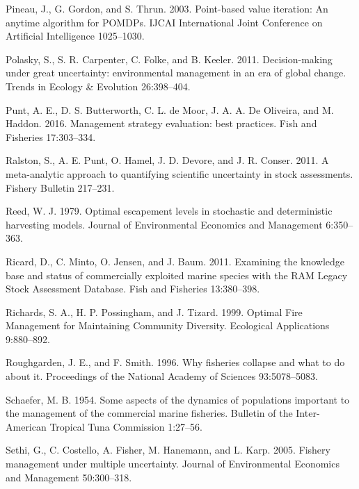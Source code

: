 \documentclass[3p]{elsarticle} %
\begin{document}
\leavevmode\hypertarget{ref-Pineau2003}{}%
Pineau, J., G. Gordon, and S. Thrun. 2003. Point-based value iteration:
An anytime algorithm for POMDPs. IJCAI International Joint Conference on
Artificial Intelligence 1025--1030.

\leavevmode\hypertarget{ref-Polasky2011}{}%
Polasky, S., S. R. Carpenter, C. Folke, and B. Keeler. 2011.
Decision-making under great uncertainty: environmental management in an
era of global change. Trends in Ecology \& Evolution 26:398--404.

\leavevmode\hypertarget{ref-Punt2016}{}%
Punt, A. E., D. S. Butterworth, C. L. de Moor, J. A. A. De Oliveira, and
M. Haddon. 2016. Management strategy evaluation: best practices. Fish
and Fisheries 17:303--334.

\leavevmode\hypertarget{ref-Ralston2011}{}%
Ralston, S., A. E. Punt, O. Hamel, J. D. Devore, and J. R. Conser. 2011.
A meta-analytic approach to quantifying scientific uncertainty in stock
assessments. Fishery Bulletin 217--231.

\leavevmode\hypertarget{ref-Reed1979}{}%
Reed, W. J. 1979. Optimal escapement levels in stochastic and
deterministic harvesting models. Journal of Environmental Economics and
Management 6:350--363.

\leavevmode\hypertarget{ref-RAM}{}%
Ricard, D., C. Minto, O. Jensen, and J. Baum. 2011. Examining the
knowledge base and status of commercially exploited marine species with
the RAM Legacy Stock Assessment Database. Fish and Fisheries
13:380--398.

\leavevmode\hypertarget{ref-Richards1999}{}%
Richards, S. A., H. P. Possingham, and J. Tizard. 1999. Optimal Fire
Management for Maintaining Community Diversity. Ecological Applications
9:880--892.

\leavevmode\hypertarget{ref-Roughgarden1996}{}%
Roughgarden, J. E., and F. Smith. 1996. Why fisheries collapse and what
to do about it. Proceedings of the National Academy of Sciences
93:5078--5083.

\leavevmode\hypertarget{ref-Schaefer1954}{}%
Schaefer, M. B. 1954. Some aspects of the dynamics of populations
important to the management of the commercial marine fisheries. Bulletin
of the Inter-American Tropical Tuna Commission 1:27--56.

\leavevmode\hypertarget{ref-Sethi2005}{}%
Sethi, G., C. Costello, A. Fisher, M. Hanemann, and L. Karp. 2005.
Fishery management under multiple uncertainty. Journal of Environmental
Economics and Management 50:300--318.
\end{document}
